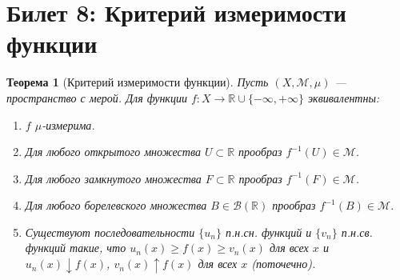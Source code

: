 \documentclass[a4paper, 12pt]{article}
\newtheorem{theorem}{Теорема}
\newcommand{\R}{\mathbb{R}}
\newcommand{\B}{\mathcal{B}}
\newcommand{\1}{\mathbf{1}}
\begin{document}
\section*{Билет 8: Критерий измеримости функции}
\begin{theorem}[Критерий измеримости функции]
    Пусть $(X, \mathcal{M}, \mu)$ — пространство с мерой. Для функции $f: X \to \R \cup \{-\infty, +\infty\}$ эквивалентны:
    \begin{enumerate}[label=(\arabic*)]
        \item $f$ $\mu$-измерима.
        \item Для любого открытого множества $U \subset \R$ прообраз $f^{-1}(U) \in \mathcal{M}$.
        \item Для любого замкнутого множества $F \subset \R$ прообраз $f^{-1}(F) \in \mathcal{M}$.
        \item Для любого борелевского множества $B \in \B(\R)$ прообраз $f^{-1}(B) \in \mathcal{M}$.
        \item Существуют последовательности $\{u_n\}$ п.н.сн. функций и $\{v_n\}$ п.н.св. функций такие, что $u_n(x) \geq f(x) \geq v_n(x)$ для всех $x$ и $u_n(x) \downarrow f(x)$, $v_n(x) \uparrow f(x)$ для всех $x$ (поточечно).
    \end{enumerate}
\end{theorem}
\end{document}
